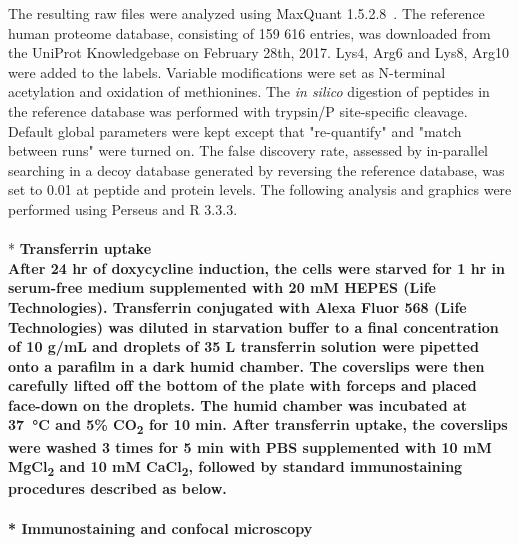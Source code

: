 The resulting raw files were analyzed using MaxQuant 1.5.2.8~\cite{Cox}. The reference human proteome database, consisting of 159 616 entries, was downloaded from the UniProt Knowledgebase on February 28th, 2017. Lys4, Arg6 and Lys8, Arg10 were added to the labels. Variable modifications were set as N-terminal acetylation and oxidation of methionines. The \textit{in silico} digestion of peptides in the reference database was performed with trypsin/P site-specific cleavage. Default global parameters were kept except that "re-quantify" and "match between runs" were turned on. The false discovery rate, assessed by in-parallel searching in a decoy database generated by reversing the reference database, was set to 0.01 at peptide and protein levels. The following analysis and graphics were performed using Perseus and R 3.3.3.
\\
\\*
\bfseries{Transferrin uptake}\\
\normalfont After 24 hr of doxycycline induction, the cells were starved for 1 hr in serum-free medium supplemented with 20 mM HEPES (Life Technologies). Transferrin conjugated with Alexa Fluor 568 (Life Technologies) was diluted in starvation buffer to a final concentration of 10 {}\textmu g/mL and droplets of 35 {}\textmu L transferrin solution were pipetted onto a parafilm in a dark humid chamber. The coverslips were then carefully lifted off the bottom of the plate with forceps and placed face-down on the droplets. The humid chamber was incubated at \SI{37}{\celsius} and 5\% CO\textsubscript{2} for 10 min. After transferrin uptake, the coverslips were washed 3 times for 5 min with PBS supplemented with 10 mM MgCl\textsubscript{2} and 10 mM CaCl\textsubscript{2}, followed by standard immunostaining procedures described as below.
\\
\\*
\bfseries{Immunostaining and confocal microscopy}\\
